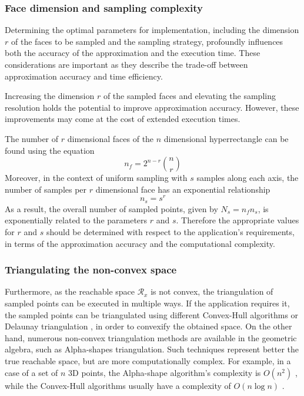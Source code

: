 \subsubsection*{Face dimension and sampling complexity} Determining the optimal parameters for implementation, including the dimension $r$ of the faces to be sampled and the sampling strategy, profoundly influences both the accuracy of the approximation and the execution time. These considerations are important as they describe the trade-off between approximation accuracy and time efficiency.

Increasing the dimension $r$ of the sampled faces and elevating the sampling resolution holds the potential to improve approximation accuracy. However, these improvements may come at the cost of extended execution times.

The number of $r$ dimensional faces of the $n$ dimensional hyperrectangle can be found using the equation
$$
n_f = 2^{n-r}\binom{n}{r}
$$
Moreover, in the context of uniform sampling with $s$ samples along each axis, the number of samples per $r$ dimensional face has an exponential relationship
$$
n_s = s^r
$$
As a result, the overall number of sampled points, given by $N_s = n_fn_s$, is exponentially related to the parameters $r$ and $s$. Therefore the appropriate values for $r$ and $s$ should be determined with respect to the application's requirements, in terms of the approximation accuracy and the computational complexity. 

\subsubsection*{Triangulating the non-convex space}
Furthermore, as the reachable space $\mathcal{R}_x$ is not convex, the triangulation of sampled points can be executed in multiple ways. If the application requires it, the sampled points can be triangulated using different Convex-Hull algorithms or Delaunay triangulation \cite{Lo1989Delaunay}, in order to convexify the obtained space. On the other hand, numerous non-convex triangulation methods are available in the geometric algebra, such as Alpha-shapes \cite{Edelsbrunner1994AlphaShape} triangulation. Such techniques represent better the true reachable space, but are more computationally complex. For example, in a case of a set of $n$ 3D points, the Alpha-shape algorithm's complexity is $O(n^2)$ \cite{Edelsbrunner1994AlphaShape}, while the Convex-Hull algorithms usually have a complexity of $O(n\log n)$ \cite{Barber1996}. 

